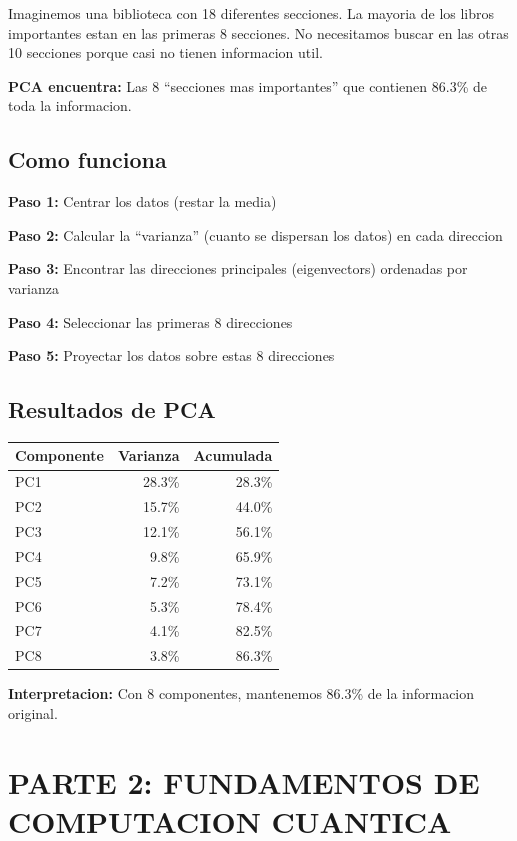 \documentclass[11pt]{article}
\begin{document}
Imaginemos una biblioteca con 18 diferentes secciones. La mayoria de los libros importantes estan en las primeras 8 secciones. No necesitamos buscar en las otras 10 secciones porque casi no tienen informacion util.

\textbf{PCA encuentra:} Las 8 ``secciones mas importantes'' que contienen 86.3\% de toda la informacion.

\subsection*{Como funciona}

\textbf{Paso 1:} Centrar los datos (restar la media)

\textbf{Paso 2:} Calcular la ``varianza'' (cuanto se dispersan los datos) en cada direccion

\textbf{Paso 3:} Encontrar las direcciones principales (eigenvectors) ordenadas por varianza

\textbf{Paso 4:} Seleccionar las primeras 8 direcciones

\textbf{Paso 5:} Proyectar los datos sobre estas 8 direcciones

\subsection*{Resultados de PCA}

\begin{tabular}{|l|r|r|}
\hline
\textbf{Componente} & \textbf{Varianza} & \textbf{Acumulada} \\
\hline
PC1 & 28.3\% & 28.3\% \\
PC2 & 15.7\% & 44.0\% \\
PC3 & 12.1\% & 56.1\% \\
PC4 & 9.8\% & 65.9\% \\
PC5 & 7.2\% & 73.1\% \\
PC6 & 5.3\% & 78.4\% \\
PC7 & 4.1\% & 82.5\% \\
PC8 & 3.8\% & 86.3\% \\
\hline
\end{tabular}

\textbf{Interpretacion:} Con 8 componentes, mantenemos 86.3\% de la informacion original.

\section*{PARTE 2: FUNDAMENTOS DE COMPUTACION CUANTICA}
\end{document}
